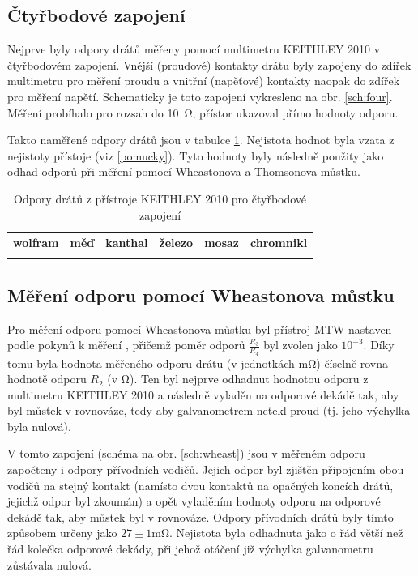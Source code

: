 \documentclass{../concepts/prepareprotokol} %
\begin{document}
\subsection{Čtyřbodové zapojení}

Nejprve byly odpory drátů měřeny pomocí multimetru KEITHLEY 2010 v čtyřbodovém zapojení. Vnější (proudové) kontakty drátu
byly zapojeny do zdířek multimetru pro měření proudu a vnitřní (napěťové) kontakty naopak do zdířek pro měření napětí. 
Schematicky je toto zapojení vykresleno na obr. \ref{sch:four}.
Měření probíhalo pro rozsah do \SI{10}{\ohm}, přístor ukazoval přímo hodnoty odporu.

Takto naměřené odpory drátů jsou v tabulce \ref{tab:keithley}. Nejistota hodnot byla vzata z nejistoty přístoje 
(viz \ref{pomucky}). Tyto hodnoty byly následně použity jako odhad odporů při měření pomocí Wheastonova a Thomsonova
můstku.

\begin{table}[!hbtp]
\centering
\caption{Odpory drátů z přístroje KEITHLEY 2010 pro čtyřbodové zapojení}
\begin{tabular}{cccccc}
 \toprule
 wolfram & měď & kanthal & železo & mosaz & chromnikl \\
 \midrule
   &  &  &  &  &  \\
 \bottomrule
\end{tabular}
\label{tab:keithley}
\end{table}

\subsection{Měření odporu pomocí Wheastonova můstku}

Pro měření odporu pomocí Wheastonova můstku byl přístroj MTW nastaven podle pokynů k měření \cite{pokyny},
přičemž poměr odporů $\frac{R_3}{R_4}$ byl zvolen jako $10^{-3}$. Díky tomu byla hodnota měřeného odporu drátu 
(v jednotkách \si{\milli\ohm}) číselně rovna hodnotě odporu $R_2$ (v \si{\ohm}). Ten byl nejprve odhadnut
hodnotou odporu z multimetru KEITHLEY 2010 a následně vyladěn na odporové dekádě tak, aby byl můstek 
v rovnováze, tedy aby galvanometrem netekl proud (tj. jeho výchylka byla nulová).

V tomto zapojení (schéma na obr. \ref{sch:wheast}) jsou v měřeném odporu započteny i odpory přívodních vodičů. 
Jejich odpor byl zjištěn připojením obou vodičů na stejný kontakt (namísto dvou kontaktů na opačných koncích drátů, 
jejichž odpor byl zkoumán) a opět vyladěním hodnoty odporu na odporové dekádě tak, aby můstek byl v rovnováze.
Odpory přívodních drátů byly tímto způsobem určeny jako $27 \pm 1 \si{\milli\ohm}$. Nejistota byla odhadnuta
jako o řád větší než řád kolečka odporové dekády, při jehož otáčení již výchylka galvanometru zůstávala nulová.
\end{document}
